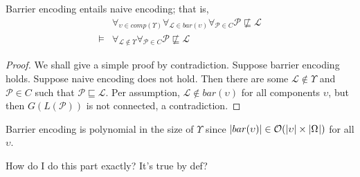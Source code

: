 \documentclass[12pt]{llncs}
\DeclarePairedDelimiter{\abs}{\lvert}{\rvert}
\newcommand{\poset}[1]{\mathcal{#1}}
\newcommand{\uni}[1][]{\Omega_{#1}}
\newcommand{\lang}[1]{L(#1)}
\newcommand{\sgraph}[1]{G(#1)}
\newcommand{\lext}{\sqsubseteq}
\newcommand{\bigo}[1]{\mathcal{O}(#1)}
\begin{document}
\begin{proposition}
    Barrier encoding entails naive encoding; that is,
    \begin{align*}
        & \forall_{\upsilon \in comp(\Upsilon)} \forall_{\poset{L} \in bar(\upsilon)} \forall_{\poset{P} \in C} \poset{P} \not\lext \poset{L}\\
        \models & \forall_{\poset{L} \not\in \Upsilon} \forall_{\poset{P} \in C} \poset{P} \not\lext \poset{L}
    \end{align*}
\end{proposition}
\begin{proof}
    We shall give a simple proof by contradiction. Suppose barrier encoding holds. Suppose naive encoding does not hold. Then there are some $\poset{L} \not\in \Upsilon$ and $\poset{P} \in C$ such that $\poset{P} \lext \poset{L}$. Per assumption, $\poset{L} \not\in bar(\upsilon)$ for all components $\upsilon$, but then $\sgraph{\lang{\poset{P}}}$ is not connected, a contradiction.
\end{proof}

Barrier encoding is polynomial in the size of $\Upsilon$ since $\abs{bar(\upsilon)} \in \bigo{\abs{\upsilon} \times \abs{\uni}}$ for all $\upsilon$.

How do I do this part exactly? It's true by def?

\end{document}
